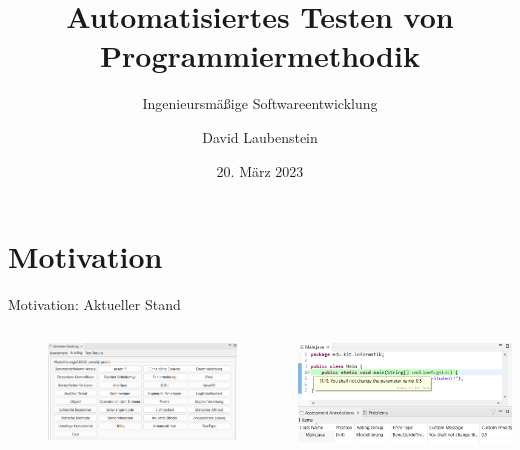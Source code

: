\documentclass{sdqbeamer}
\title[Automatisiertes Testen von Programmiermethodik]{Automatisiertes Testen von
Programmiermethodik}
\subtitle{Ingenieursmäßige Softwareentwicklung}
\author[David Laubenstein]{David Laubenstein}
\date[20.\,03.\,2023]{20. März 2023}
\begin{document}
 
\KITtitleframe


\section{Motivation}
\begin{frame}{Motivation: Aktueller Stand}
    \begin{columns}
        \begin{column}{0.48\textwidth}
            \begin{figure}
                \includegraphics[scale=0.38]{logos/gradingedition_grading.png}
                \caption{\cite{gradingTool}}
                \label{fig:gradingTool}
            \end{figure}
        \end{column}
        \pause
        \begin{column}{0.48\textwidth}
            \begin{center}
            \includegraphics[scale=0.38]{logos/gradingedition_annotation.png}
            \end{center}
        \end{column}
    \end{columns}
\end{frame}
\end{document}
